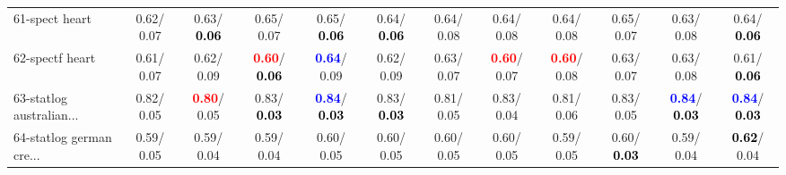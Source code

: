 \begin{table}[h]
\begin{center}
{\begin{tabular}{lc|c|c|c|c|c|c|c|c|c|c}
61-spect heart &   0.62/  0.07 &   0.63/\textcolor{black}{\textbf{  0.06}} &   0.65/  0.07 &   0.65/\textcolor{black}{\textbf{  0.06}} &   0.64/\textcolor{black}{\textbf{  0.06}} &   0.64/  0.08 &   0.64/  0.08 &   0.64/  0.08 &   0.65/  0.07 &   0.63/  0.08 &   0.64/\textcolor{black}{\textbf{  0.06}} \\
62-spectf heart &   0.61/  0.07 &   0.62/  0.09 & \textcolor{red}{\textbf{  0.60}}/\textcolor{black}{\textbf{  0.06}} & \textcolor{blue}{\textbf{  0.64}}/  0.09 &   0.62/  0.09 &   0.63/  0.07 & \textcolor{red}{\textbf{  0.60}}/  0.07 & \textcolor{red}{\textbf{  0.60}}/  0.08 &   0.63/  0.07 &   0.63/  0.08 &   0.61/\textcolor{black}{\textbf{  0.06}} \\
63-statlog australian... &   0.82/  0.05 & \textcolor{red}{\textbf{  0.80}}/  0.05 &   0.83/\textcolor{black}{\textbf{  0.03}} & \textcolor{blue}{\textbf{  0.84}}/\textcolor{black}{\textbf{  0.03}} &   0.83/\textcolor{black}{\textbf{  0.03}} &   0.81/  0.05 &   0.83/  0.04 &   0.81/  0.06 &   0.83/  0.05 & \textcolor{blue}{\textbf{  0.84}}/\textcolor{black}{\textbf{  0.03}} & \textcolor{blue}{\textbf{  0.84}}/\textcolor{black}{\textbf{  0.03}} \\
64-statlog german cre... &   0.59/  0.05 &   0.59/  0.04 &   0.59/  0.04 &   0.60/  0.05 &   0.60/  0.05 &   0.60/  0.05 &   0.60/  0.05 &   0.59/  0.05 &   0.60/\textcolor{black}{\textbf{  0.03}} &   0.59/  0.04 & \textcolor{black}{\textbf{  0.62}}/  0.04 \\\end{tabular}}\label{stratsBalAcc1bC4.5}
\end{center}
\end{table}
